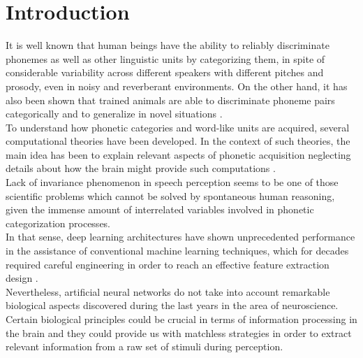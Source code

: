 \documentclass[11pt,a4paper]{article}
\begin{document}
\section{Introduction}

It is well known that human beings have the ability to reliably discriminate phonemes
as well as other linguistic units by categorizing them,
in spite of considerable variability across different speakers
with different pitches and prosody, even in noisy and reverberant
environments.
On the other hand, it has also been shown that trained animals
are able to discriminate phoneme
pairs categorically and to generalize in novel situations
\cite{kuhl_1975, kuhl_1983, kluender_1998, pons_2006, hienz_1996, dent_1997, lotto_1997}. \\

To understand how phonetic categories and word-like units
are acquired, several computational theories have been developed.
In the context of such theories, the main idea has
been to explain relevant aspects of phonetic acquisition neglecting details
about how the brain might provide such
computations \cite{rasanen_2012}. \\

Lack of invariance phenomenon in speech perception
\cite{appelbaum_1996}
seems to be one of those scientific problems which
cannot be solved by spontaneous human reasoning,
given the immense amount of interrelated variables
involved in phonetic categorization processes. \\

In that sense, deep learning architectures have shown
unprecedented performance in the assistance of
conventional machine learning techniques, which for decades 
required careful engineering
in order to reach an effective feature extraction design
\cite{lecun_2015}. \\

Nevertheless, artificial neural networks do not take into account
remarkable biological aspects discovered during the last years
in the area of neuroscience.
Certain biological principles could be crucial in terms of
information processing in the brain and they could
provide us with matchless strategies in order to extract
relevant information from a raw set of stimuli
during perception. \\
\end{document}
